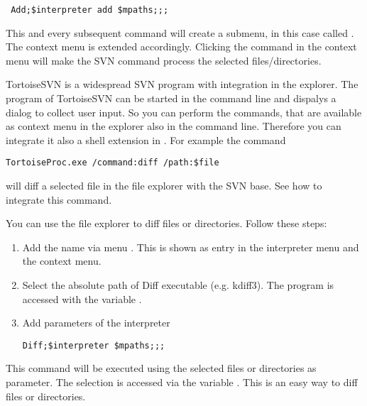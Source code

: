 \begin{lstlisting}
 Add;$interpreter add $mpaths;;;
\end{lstlisting}

This and every subsequent command will create a submenu, in this case called . The context menu is extended accordingly. Clicking the command in the context menu will make the SVN command  process the selected files/directories.

TortoiseSVN is a widespread SVN program with integration in the explorer. The program  of TortoiseSVN can be started in the command line and dispalys a dialog to collect user input. So you can perform the commands, that are available as context menu in the explorer also in the command line. Therefore you can integrate it also a shell extension in \codeblocks. For example the command

\begin{lstlisting}
TortoiseProc.exe /command:diff /path:$file
\end{lstlisting}

will diff a selected file in the \codeblocks file explorer with the SVN base. See  how to integrate this command.



You can use the file explorer to diff files or directories. Follow these steps:

\begin{enumerate}
\item Add the name via menu . This is shown as entry in the interpreter menu and the context menu.
\item Select the absolute path of Diff executable (e.g. kdiff3). The program is accessed with the variable .
\item Add parameters of the interpreter
\begin{lstlisting}
Diff;$interpreter $mpaths;;;
\end{lstlisting}
\end{enumerate}

This command will be executed using the selected files or directories as parameter. The selection is accessed via the variable . This is an easy way to diff files or directories.

